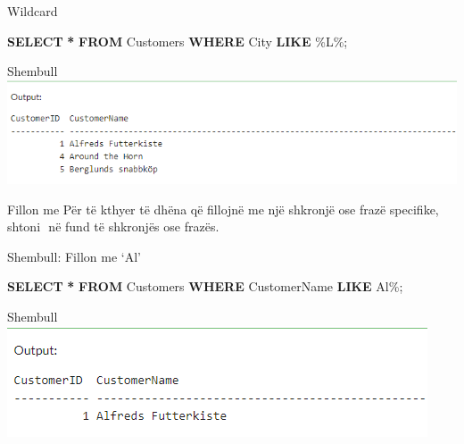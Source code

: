 \documentclass[
  ignorenonframetext,
]{beamer}
\newenvironment{Shaded}{\begin{snugshade}}{\end{snugshade}}
\newcommand{\KeywordTok}[1]{\textcolor[rgb]{0.13,0.29,0.53}{\textbf{#1}}}
\newcommand{\NormalTok}[1]{#1}
\newcommand{\OperatorTok}[1]{\textcolor[rgb]{0.81,0.36,0.00}{\textbf{#1}}}
\newcommand{\StringTok}[1]{\textcolor[rgb]{0.31,0.60,0.02}{#1}}
\begin{document}
\begin{frame}[fragile]{Wildcard}
\label{wildcard-2}
\begin{Shaded}
\begin{Highlighting}[]
\KeywordTok{SELECT} \OperatorTok{*}
\KeywordTok{FROM}\NormalTok{ Customers}
\KeywordTok{WHERE}\NormalTok{ City }\KeywordTok{LIKE} \StringTok{\textquotesingle{}\%L\%\textquotesingle{}}\NormalTok{;}
\end{Highlighting}
\end{Shaded}
\end{frame}

\begin{frame}{Shembull}
\label{shembull-6}
\includegraphics{./Figs/query62.png}
\end{frame}

\begin{frame}{Fillon me}
\label{fillon-me}
Për të kthyer të dhëna që fillojnë me një shkronjë ose frazë specifike,
shtoni \(%
\) në fund të shkronjës ose frazës.
\end{frame}

\begin{frame}[fragile]{Shembull: Fillon me `Al'}
\label{shembull-fillon-me-al}

\begin{Shaded}
\begin{Highlighting}[]
\KeywordTok{SELECT} \OperatorTok{*}
\KeywordTok{FROM}\NormalTok{ Customers}
\KeywordTok{WHERE}\NormalTok{ CustomerName }\KeywordTok{LIKE} \StringTok{\textquotesingle{}Al\%\textquotesingle{}}\NormalTok{;}
\end{Highlighting}
\end{Shaded}
\end{frame}

\begin{frame}{Shembull}
\label{shembull-7}
\includegraphics{./Figs/query63.png}
\end{frame}
\end{document}
